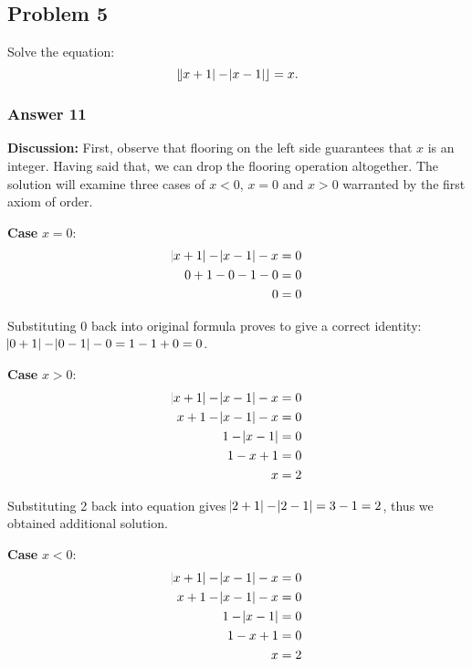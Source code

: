 \documentclass[11pt]{article}
\begin{document}
\subsection{Problem 5}
\label{sec-1-5}
Solve the equation:
\begin{equation*}
   \lfloor \abs{x+1}-\abs{x-1} \rfloor = x.
\end{equation*}


\subsubsection{Answer 11}
\label{sec-1-5-1}
\textbf{Discussion:} First, observe that flooring on the left side guarantees
that $x$ is an integer.  Having said that, we can drop the flooring operation
altogether.  The solution will examine three cases of $x < 0$, $x = 0$ and
$x > 0$ warranted by the first axiom of order.

\textbf{Case} $x=0$: 
\begin{equation*}
  \begin{aligned}
    \abs{x+1}-\abs{x-1}-x &= 0 \\
    0 + 1 - 0 - 1 - 0     &= 0 \\
    0                     &= 0
  \end{aligned}
\end{equation*}

Substituting 0 back into original formula proves to give a correct identity:
$\abs{0+1}-\abs{0-1}-0=1-1+0=0$.

\textbf{Case} $x>0$:
\begin{equation*}
  \begin{aligned}
    \abs{x + 1} - \abs{x - 1} - x &= 0 \\
    x + 1 - \abs{x - 1} - x       &= 0 \\
    1 - \abs{x - 1}               &= 0 \\
    1 - x + 1                     &= 0 \\
    x                             &= 2
  \end{aligned}
\end{equation*}

Substituting 2 back into equation gives $\abs{2+1}-\abs{2-1}=3-1=2$, thus
we obtained additional solution.

\textbf{Case} $x<0$:
\begin{equation*}
  \begin{aligned}
    \abs{x + 1} - \abs{x - 1} - x &= 0 \\
    x + 1 - \abs{x - 1} - x       &= 0 \\
    1 - \abs{x - 1}               &= 0 \\
    1 - x + 1                     &= 0 \\
    x                             &= 2
  \end{aligned}
\end{equation*}
\end{document}
